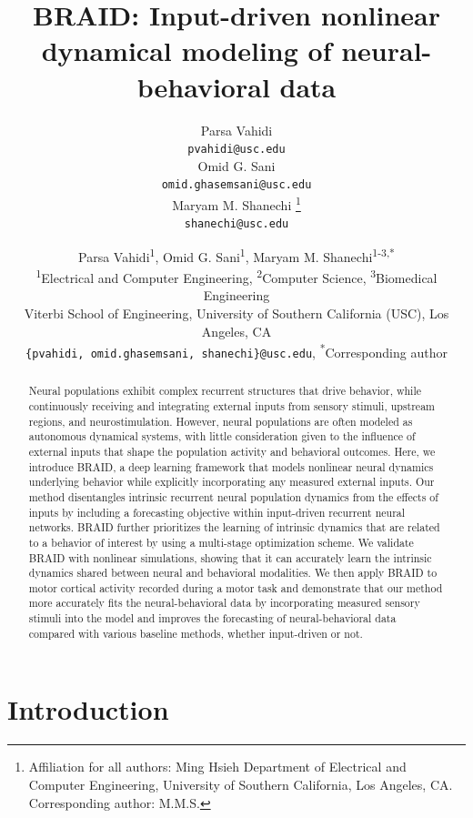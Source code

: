 \documentclass{article} %
\title{BRAID: Input-driven nonlinear dynamical modeling of neural-behavioral data}
\author{Parsa Vahidi \\
  \texttt{pvahidi@usc.edu} \\
  \And
  Omid G. Sani \\
  \texttt{omid.ghasemsani@usc.edu} \\
  \And
  Maryam M. Shanechi
  \thanks{Affiliation for all authors: Ming Hsieh Department of Electrical and Computer Engineering, University of Southern California, Los Angeles, CA. Corresponding author: M.M.S. }
  \\
  \texttt{shanechi@usc.edu} \\
}
\author{Parsa Vahidi\textsuperscript{1}, 
Omid G. Sani\textsuperscript{1}, 
Maryam M. Shanechi\textsuperscript{1-3,*}
         \\
\textsuperscript{1}Electrical and Computer Engineering, 
\textsuperscript{2}Computer Science, 
\textsuperscript{3}Biomedical Engineering\\
Viterbi School of Engineering, University of Southern California (USC), Los Angeles, CA \\
\texttt{\{pvahidi, omid.ghasemsani, shanechi\}@usc.edu},    \textsuperscript{*}Corresponding author
 }
\newcommand{\ourmethod}{BRAID}
\begin{document}

\maketitle

\begin{abstract}
Neural populations exhibit complex recurrent structures that drive behavior, while continuously receiving and integrating external inputs from sensory stimuli, upstream regions, and neurostimulation. However, neural populations are often modeled as autonomous dynamical systems, with little consideration given to the influence of external inputs that shape the population activity and behavioral outcomes. Here, we introduce \ourmethod{}, a deep learning framework that models nonlinear neural dynamics underlying behavior while explicitly incorporating any measured external inputs. Our method disentangles intrinsic recurrent neural population dynamics from the effects of inputs by including a forecasting objective within input-driven recurrent neural networks. \ourmethod{} further prioritizes the learning of intrinsic dynamics that are related to a behavior of interest by using a multi-stage optimization scheme. We validate \ourmethod{} with nonlinear simulations, showing that it can accurately learn the intrinsic dynamics shared between neural and behavioral modalities. We then apply \ourmethod{} to motor cortical activity recorded during a motor task and demonstrate that our method more accurately fits the neural-behavioral data by incorporating measured sensory stimuli into the model and improves the forecasting of neural-behavioral data compared with various baseline methods, whether input-driven or not.
\end{abstract}

\section{Introduction}

\end{document}
